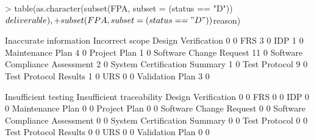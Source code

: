\documentclass{article}
\begin{document}
\begin{Schunk}
\begin{Sinput}
> table(as.character(subset(FPA, subset = (status == "D"))$deliverable),
+       subset(FPA, subset = (status == "D"))$reason)
\end{Sinput}
\begin{Soutput}
                                 Inaccurate information Incorrect scope
  Design Verification                                 0               0
  FRS                                                 3               0
  IDP                                                 1               0
  Maintenance Plan                                    4               0
  Project Plan                                        1               0
  Software Change Request                            11               0
  Software Compliance Assessment                      2               0
  System Certification Summary                        1               0
  Test Protocol                                       9               0
  Test Protocol Results                               1               0
  URS                                                 0               0
  Validation Plan                                     3               0
                                
                                 Insufficient testing Insufficient traceability
  Design Verification                               0                         0
  FRS                                               0                         0
  IDP                                               0                         0
  Maintenance Plan                                  0                         0
  Project Plan                                      0                         0
  Software Change Request                           0                         0
  Software Compliance Assessment                    0                         0
  System Certification Summary                      0                         0
  Test Protocol                                     0                         0
  Test Protocol Results                             0                         0
  URS                                               0                         0
  Validation Plan                                   0                         0
                                

\end{Soutput}
\end{Schunk}
\end{document}
